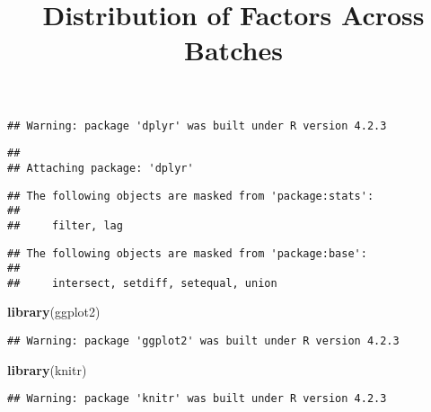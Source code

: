 \documentclass[
]{article}
\title{Distribution of Factors Across Batches}
\author{}
\date{\vspace{-2.5em}}
\newenvironment{Shaded}{\begin{snugshade}}{\end{snugshade}}
\newcommand{\AttributeTok}[1]{\textcolor[rgb]{0.13,0.29,0.53}{#1}}
\newcommand{\CommentTok}[1]{\textcolor[rgb]{0.56,0.35,0.01}{\textit{#1}}}
\newcommand{\ConstantTok}[1]{\textcolor[rgb]{0.56,0.35,0.01}{#1}}
\newcommand{\FunctionTok}[1]{\textcolor[rgb]{0.13,0.29,0.53}{\textbf{#1}}}
\newcommand{\NormalTok}[1]{#1}
\newcommand{\SpecialCharTok}[1]{\textcolor[rgb]{0.81,0.36,0.00}{\textbf{#1}}}
\begin{document}
\maketitle

\begin{Shaded}
\end{Shaded}

\begin{verbatim}
## Warning: package 'dplyr' was built under R version 4.2.3
\end{verbatim}

\begin{verbatim}
## 
## Attaching package: 'dplyr'
\end{verbatim}

\begin{verbatim}
## The following objects are masked from 'package:stats':
## 
##     filter, lag
\end{verbatim}

\begin{verbatim}
## The following objects are masked from 'package:base':
## 
##     intersect, setdiff, setequal, union
\end{verbatim}

\begin{Shaded}
\begin{Highlighting}[]
\FunctionTok{library}\NormalTok{(ggplot2)}
\end{Highlighting}
\end{Shaded}

\begin{verbatim}
## Warning: package 'ggplot2' was built under R version 4.2.3
\end{verbatim}

\begin{Shaded}
\begin{Highlighting}[]
\FunctionTok{library}\NormalTok{(knitr)}
\end{Highlighting}
\end{Shaded}

\begin{verbatim}
## Warning: package 'knitr' was built under R version 4.2.3
\end{verbatim}
\end{document}
